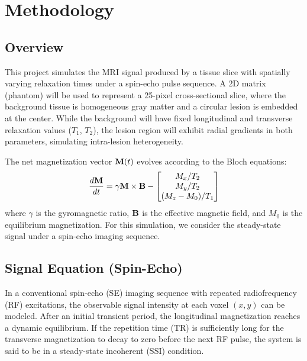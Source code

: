 \documentclass[10pt,a4paper,twoside]{article}
\begin{document}
\section{Methodology}\label{sec:methods}

\subsection{Overview}

This project simulates the MRI signal produced by a tissue slice with spatially varying relaxation times under a spin-echo pulse sequence. A 2D matrix (phantom) will be used to represent a 25-pixel cross-sectional slice, where the background tissue is homogeneous gray matter and a circular lesion is embedded at the center. While the background will have fixed longitudinal and transverse relaxation values (\(T_1\), \(T_2\)), the lesion region will exhibit radial gradients in both parameters, simulating intra-lesion heterogeneity.

The net magnetization vector \(\vb{M}(t)\) evolves according to the Bloch equations:
\begin{align}
\frac{d\vb{M}}{dt} = \gamma \vb{M} \times \vb{B} - 
\begin{bmatrix}
    M_x / T_2 \\
    M_y / T_2 \\
    (M_z - M_0)/ T_1
\end{bmatrix}
\end{align}
where \( \gamma \) is the gyromagnetic ratio, \( \vb{B} \) is the effective magnetic field, and \( M_0 \) is the equilibrium magnetization. For this simulation, we consider the steady-state signal under a spin-echo imaging sequence.

\subsection{Signal Equation (Spin-Echo)}

In a conventional spin-echo (SE) imaging sequence with repeated radiofrequency (RF) excitations, the observable signal intensity at each voxel $(x, y)$ can be modeled. After an initial transient period, the longitudinal magnetization reaches a dynamic equilibrium. If the repetition time (TR) is sufficiently long for the transverse magnetization to decay to zero before the next RF pulse, the system is said to be in a steady-state incoherent (SSI) condition. 
\end{document}
